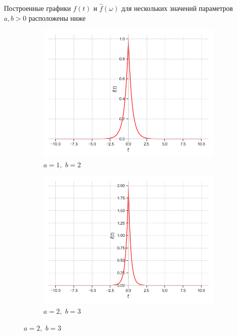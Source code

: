 \documentclass[a4paper, 16pt]{article}
\begin{document}
    \noindent Построенные графики $f(t)$ и $\hat{f}\left(\omega\right)$ для нескольких значений параметров $a,b>0$ расположены ниже
    \begin{figure}[htbp]
        \centering
        \begin{subfigure}{0.3\textwidth}
            \centering
            \includegraphics[width=\linewidth]{doat_a=1_b=2.png}
            \caption{$a=1,\,\,b=2$}
            \label{fig:doat_1}
        \end{subfigure}
        \hfill
        \begin{subfigure}{0.3\textwidth}
            \centering
            \includegraphics[width=\linewidth]{doat_a=2_b=3.png}
            \caption{$a=2,\,\,b=3$}

\end{subfigure}
\end{figure}
\end{document}
